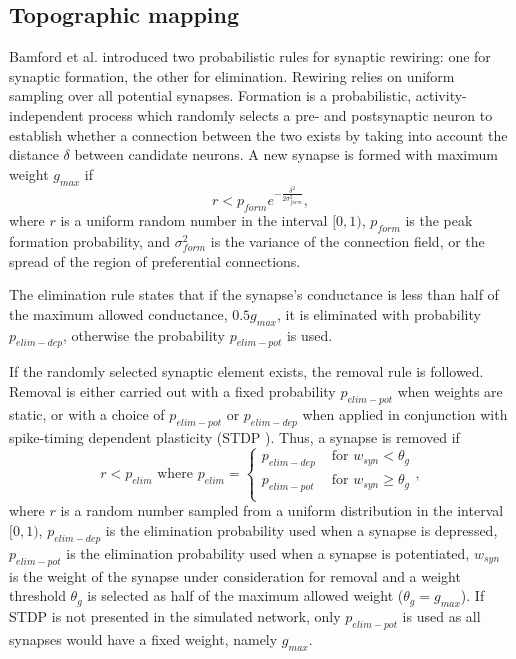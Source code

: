 \documentclass[letterpaper, 10 pt, conference]{ieeeconf}  %
\begin{document}
\subsection{Topographic mapping}

Bamford et al. \cite{bamford2010synaptic} introduced two probabilistic rules for synaptic rewiring: one for synaptic formation, the other for elimination.
Rewiring relies on uniform sampling over all potential synapses. 
Formation is a probabilistic, activity-independent process which randomly selects a pre- and postsynaptic neuron to establish whether a connection between the two exists by taking into account the distance $\delta$ between candidate neurons. 
A new synapse is formed with maximum weight $g_{max}$ if
%
\begin{equation} \label{eq:formation_rule}
r<p_{form}e^{-\frac{\delta^2}{2\sigma^2_{form}}},
\end{equation}
%
where $r$ is a uniform random number in the interval $[0, 1)$, $p_{form}$ is the peak formation probability, and $\sigma^2_{form}$ is the variance of the connection field, or the spread of the region of preferential connections.

The elimination rule states that if the synapse's conductance is less than half of the maximum allowed conductance, $0.5g_{max}$, it is eliminated with probability $p_{elim-dep}$, otherwise the probability $p_{elim-pot}$ is used.

If the randomly selected synaptic element exists, the removal rule is followed.
Removal is either carried out with a fixed probability $p_{elim-pot}$ when weights are static, or with a choice of $p_{elim-pot}$  or $p_{elim-dep}$ when applied in conjunction with spike-timing dependent plasticity (STDP \cite{Song2000}). 
Thus, a synapse is removed if
%
\begin{equation} \label{eq:elimination_rule}
r<p_{elim} \text{ where } p_{elim} = 
    \begin{cases}
        p_{elim-dep} & \text{ for }   w_{syn}  < \theta_g \\
        p_{elim-pot} & \text{ for }   w_{syn}  \geq \theta_g \\
    \end{cases},
\end{equation}
%
where $r$ is a random number sampled from a uniform distribution in the interval $[0, 1)$, $p_{elim-dep}$ is the elimination probability used when a synapse is depressed, $p_{elim-pot}$ is the elimination probability used when a synapse is potentiated, $w_{syn}$ is the weight of the synapse under consideration for removal and a weight threshold $\theta_g$ is selected as half of the maximum allowed weight ($ \theta_g = g_{max}$). 
If STDP is not presented in the simulated network, only $p_{elim-pot}$ is used as all synapses would have a fixed weight, namely $g_{max}$.
\end{document}
